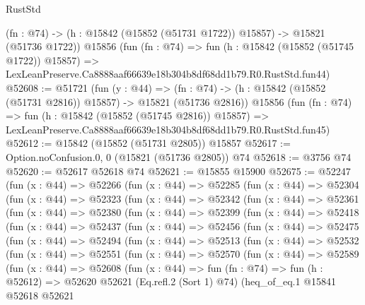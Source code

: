 \begin{lexlean}{RustStd}
\begin{coremodule}
    (fn : @74) -> (h : @15842 (@15852 (@51731 @1722)) @15857) -> @15821 (@51736 @1722))
    @15856
    (fun (fn : @74) =>
    fun (h : @15842 (@15852 (@51745 @1722)) @15857) =>
    LexLeanPreserve.Ca8888aaf66639e18b304b8df68dd1b79.R0.RustStd.fun44)
@52608 := @51721
    (fun (y : @44) =>
    (fn : @74) -> (h : @15842 (@15852 (@51731 @2816)) @15857) -> @15821 (@51736 @2816))
    @15856
    (fun (fn : @74) =>
    fun (h : @15842 (@15852 (@51745 @2816)) @15857) =>
    LexLeanPreserve.Ca8888aaf66639e18b304b8df68dd1b79.R0.RustStd.fun45)
@52612 := @15842 (@15852 (@51731 @2805)) @15857
@52617 := Option.noConfusion.{0, 0} (@15821 (@51736 @2805)) @74
@52618 := @3756 @74
@52620 := @52617 @52618 @74
@52621 := @15855 @15900
@52675 := @52247
    (fun (x : @44) =>
    @52266
      (fun (x : @44) =>
      @52285
        (fun (x : @44) =>
        @52304
          (fun (x : @44) =>
          @52323
            (fun (x : @44) =>
            @52342
              (fun (x : @44) =>
              @52361
                (fun (x : @44) =>
                @52380
                  (fun (x : @44) =>
                  @52399
                    (fun (x : @44) =>
                    @52418
                      (fun (x : @44) =>
                      @52437
                        (fun (x : @44) =>
                        @52456
                          (fun (x : @44) =>
                          @52475
                            (fun (x : @44) =>
                            @52494
                              (fun (x : @44) =>
                              @52513
                                (fun (x : @44) =>
                                @52532
                                  (fun (x : @44) =>
                                  @52551
                                    (fun (x : @44) =>
                                    @52570
                                      (fun (x : @44) =>
                                      @52589
                                        (fun (x : @44) =>
                                        @52608
                                          (fun (x : @44) =>
                                          fun (fn : @74) =>
                                          fun (h : @52612) =>
                                          @52620
                                            @52621
                                            (Eq.refl.{2} (Sort 1) @74)
                                            (heq_of_eq.{1}
                                              @15841
                                              @52618
                                              @52621

\end{coremodule}
\end{lexlean}
